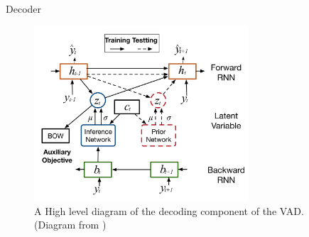 \documentclass[aspectratio=169, 11pt]{beamer}
\begin{document}
\begin{frame}{Decoder}
  \begin{figure}[!ht]
    \centering
    \includegraphics[width=80mm]{diagrams/vad_decoder.png}
    \caption{A High level diagram of the decoding component of the VAD. (Diagram from \cite{du_variational_2018})\label{r:vad_decoder}}
    \end{figure}
\end{frame}
\end{document}
